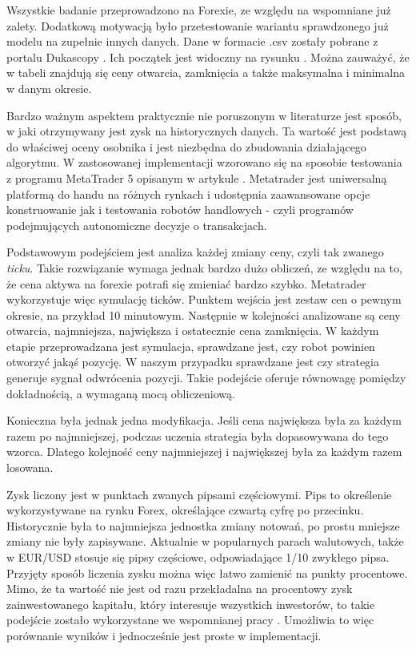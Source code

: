 \documentclass[twoside]{iisthesis}
\begin{document}
Wszystkie badanie przeprowadzono na Forexie, ze względu na wspomniane już zalety. Dodatkową motywacją było przetestowanie wariantu sprawdzonego już modelu na zupełnie innych danych. Dane w formacie .csv zostały pobrane z portalu Dukascopy \cite{data}. Ich początek jest widoczny na rysunku \cite{fig:data}. Można zauważyć, że w tabeli znajdują się ceny otwarcia, zamknięcia a także maksymalna i minimalna w danym okresie. 

Bardzo ważnym aspektem praktycznie nie poruszonym w literaturze jest sposób, w jaki otrzymywany jest zysk na historycznych danych. Ta wartość jest podstawą do właściwej oceny osobnika i jest niezbędna do zbudowania działającego algorytmu. W zastosowanej implementacji wzorowano się na sposobie testowania z programu MetaTrader 5 opisanym w artykule \cite{metatrader}. Metatrader jest uniwersalną platformą do handu na różnych rynkach i udostępnia zaawansowane opcje konstruowanie jak i testowania robotów handlowych - czyli programów podejmujących autonomiczne decyzje o transakcjach. 

Podstawowym podejściem jest analiza każdej zmiany ceny, czyli tak zwanego \textit{ticku}. Takie rozwiązanie wymaga jednak bardzo dużo obliczeń, ze względu na to, że cena aktywa na forexie potrafi się zmieniać bardzo szybko. Metatrader wykorzystuje więc symulację ticków. Punktem wejścia jest zestaw cen o pewnym okresie, na przykład 10 minutowym. Następnie w kolejności analizowane są ceny otwarcia, najmniejsza, największa i ostatecznie cena zamknięcia. W każdym etapie przeprowadzana jest symulacja, sprawdzane jest, czy robot powinien otworzyć jakąś pozycję. W naszym przypadku sprawdzane jest czy strategia generuje sygnał odwrócenia pozycji. Takie podejście oferuje równowagę pomiędzy dokładnością, a wymaganą mocą obliczeniową.

Konieczna była jednak jedna modyfikacja. Jeśli cena największa była za każdym razem po najmniejszej, podczas uczenia strategia była dopasowywana do tego wzorca. Dlatego kolejność ceny najmniejszej i największej była za każdym razem losowana.

Zysk liczony jest w punktach zwanych pipsami częściowymi. Pips to określenie wykorzystywane na rynku Forex, określające czwartą cyfrę po przecinku. Historycznie była to najmniejsza jednostka zmiany notowań, po prostu mniejsze zmiany nie były zapisywane. Aktualnie w popularnych parach walutowych, także w EUR/USD stosuje się pipsy częściowe, odpowiadające 1/10 zwykłego pipsa. Przyjęty sposób liczenia zysku można więc łatwo zamienić na punkty procentowe. Mimo, że ta wartość nie jest od razu przekładalna na procentowy zysk zainwestowanego kapitału, który interesuje wszystkich inwestorów, to takie podejście zostało wykorzystane we wspomnianej pracy \cite{Bicz}. Umożliwia to więc porównanie wyników i jednocześnie jest proste w implementacji.
\end{document}
